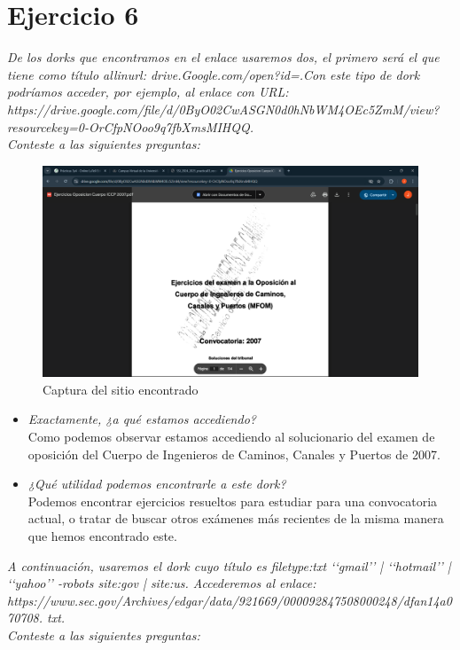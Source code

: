\documentclass[12pt]{book}
\begin{document}
\section{Ejercicio 6}
\textit{
De los dorks que encontramos en el enlace usaremos dos, el primero será el que tiene como título allinurl: drive.Google.com/open?id=.Con este tipo de dork podríamos acceder, por ejemplo, al enlace
con URL:\\
https://drive.google.com/file/d/0ByO02CwASGN0d0hNbWM4OEc5ZmM/view?resourcekey=0-OrCfpNOoo9q7fbXmsMIHQQ.\\
Conteste a las siguientes preguntas:
}
 \begin{figure}[h]
        \centering
        \includegraphics[width=0.5\linewidth]{Practica 3y4/images/Captura de pantalla (86).png}
        \caption{Captura del sitio encontrado}
        \label{fig:enter-label}
\end{figure}
\begin{itemize}
    \item \textit{Exactamente, ¿a qué estamos accediendo?}\\
        Como podemos observar estamos accediendo al solucionario del examen de oposición del Cuerpo de Ingenieros de Caminos, Canales y Puertos de 2007.
    \item \textit{¿Qué utilidad podemos encontrarle a este dork?}\\
        Podemos encontrar ejercicios resueltos para estudiar para una convocatoria actual, o tratar de buscar otros exámenes más recientes de la misma manera que hemos encontrado este.
\end{itemize}
\newpage
\textit{A continuación, usaremos el dork cuyo título es filetype:txt ‘‘gmail’’ | ‘‘hotmail’’ | ‘‘yahoo’’ -robots site:gov | site:us. Accederemos al enlace:\\
https://www.sec.gov/Archives/edgar/data/921669/000092847508000248/dfan14a070708.
txt.\\
Conteste a las siguientes preguntas:}\\
\end{document}
